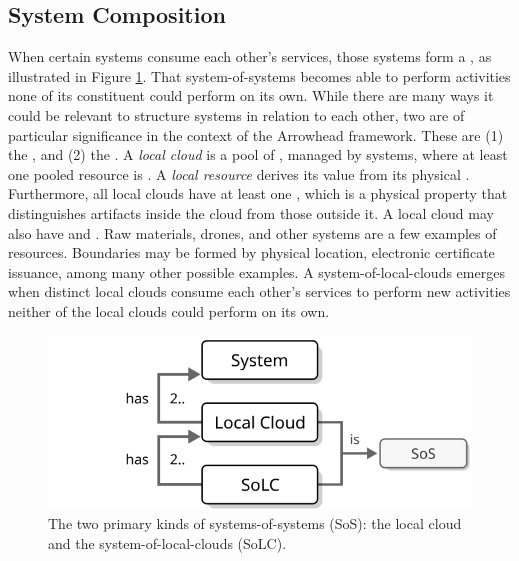 \subsection{System Composition}

When certain systems consume each other's services, those systems form a , as illustrated in Figure \ref{fig:system-of-systems-small}.
That system-of-systems becomes able to perform activities none of its constituent  could perform on its own.
While there are many ways it could be relevant to structure systems in relation to each other, two are of particular significance in the context of the Arrowhead framework.
These are (1) the , and (2) the .
A \textit{local cloud} is a pool of , managed by systems, where at least one pooled resource is .
A \textit{local resource} derives its value from its physical .
Furthermore, all local clouds have at least one , which is a physical property that distinguishes artifacts inside the cloud from those outside it.
A local cloud may also have  and .
Raw materials, drones, and other systems are a few examples of resources.
Boundaries may be formed by physical location, electronic certificate issuance, among many other possible examples.
A system-of-local-clouds emerges when distinct local clouds consume each other's services to perform new activities neither of the local clouds could perform on its own.

\begin{figure}[ht!]
  \centering
  \includegraphics[scale=0.9]{figures/system-of-systems-small}
  \caption{
    The two primary kinds of systems-of-systems (SoS): the local cloud and the system-of-local-clouds (SoLC).
  }
  \label{fig:system-of-systems-small}
\end{figure}
